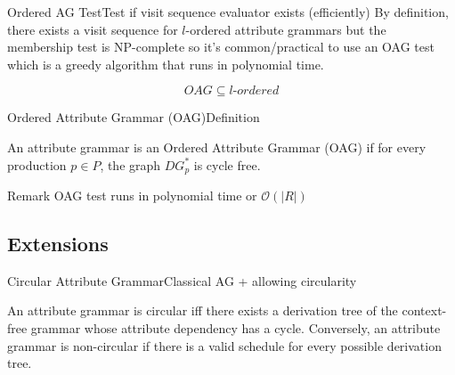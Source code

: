 \begin{frame}{Ordered AG Test}{Test if visit sequence evaluator exists (efficiently)}
By definition, there exists a visit sequence for \alert{$l$-ordered} attribute grammars but the membership test is \alert{NP-complete} \cite{ENGELFRIET1982283} so it's common/practical to use an OAG test which is a greedy algorithm that runs in \alert{polynomial time}.

\[ \mathit{OAG} \subseteq \mathit{l\text{-ordered}} \]

\end{frame}




\begin{frame}{Ordered Attribute Grammar (OAG)}{Definition}

\begin{definition}
An attribute grammar is an Ordered Attribute Grammar (OAG) if for every production $p \in P$, the graph $\mathit{DG}_p^*$ is \alert{cycle free}.
\end{definition}

\begin{block}{Remark}
OAG test runs in polynomial time or $\mathcal{O}(|R|)$
\end{block}

\end{frame}




\subsection*{Extensions}

\begin{frame}{Circular Attribute Grammar}{Classical AG + allowing circularity}
\begin{definition}
An attribute grammar is \alert{circular} iff there exists a derivation tree of the context-free grammar whose \alert{attribute dependency has a cycle}. Conversely, an attribute grammar is non-circular if there is a valid schedule for every possible derivation tree.
\end{definition}
\end{frame}

